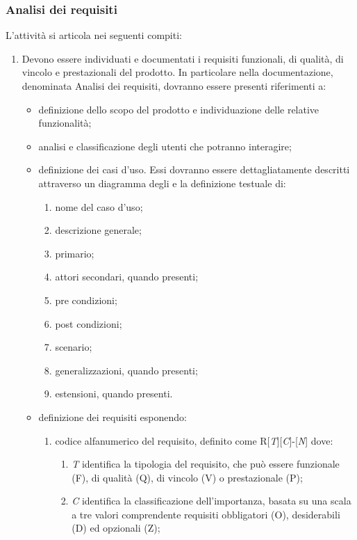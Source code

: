 \subsubsection{Analisi dei requisiti}
L'attività si articola nei seguenti compiti:
\begin{enumerate}
    \item Devono essere individuati e documentati i requisiti funzionali, di qualità, di vincolo e prestazionali del prodotto. In particolare nella documentazione, denominata Analisi dei requisiti, dovranno essere presenti riferimenti a:
    \begin{itemize}
        \item definizione dello scopo del prodotto e individuazione delle relative funzionalità;
        \item analisi e classificazione degli utenti che potranno interagire;
        \item definizione dei casi d'uso. Essi dovranno essere dettagliatamente descritti attraverso un diagramma  degli  e la definizione testuale di:
        \begin{enumerate}
            \item nome del caso d'uso;
            \item descrizione generale;
            \item {} primario;
            \item attori secondari, quando presenti;
            \item pre condizioni;
            \item post condizioni;
            \item scenario;
            \item generalizzazioni, quando presenti;
            \item estensioni, quando presenti.
        \end{enumerate}
    \item definizione dei requisiti esponendo:
    \begin{enumerate}
        \item codice alfanumerico del requisito, definito come R[\textit{T}][\textit{C}]-[\textit{N}] dove:
        \begin{enumerate}
            \item \textit{T} identifica la tipologia del requisito, che può essere funzionale (F), di qualità (Q), di vincolo (V) o prestazionale (P);
            \item \textit{C} identifica la classificazione dell'importanza, basata su una scala a tre valori comprendente requisiti obbligatori (O), desiderabili (D) ed opzionali (Z);

\end{enumerate}
\end{enumerate}
\end{itemize}
\end{enumerate}
